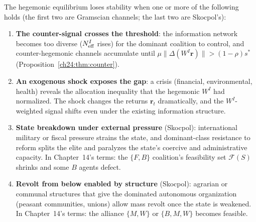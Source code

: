 \documentclass[../structural_economics_book.tex]{subfiles}
\begin{document}
\begin{conjecture}\label{ch24:prop:collapse}
The hegemonic equilibrium loses stability when one or more of the following holds (the first two are Gramscian channels; the last two are Skocpol's):
\begin{enumerate}
\item \textbf{The counter-signal crosses the threshold}: the information network becomes too diverse ($N_{\text{eff}}^I$ rises) for the dominant coalition to control, and counter-hegemonic channels accumulate until $\mu\|\Delta(W^I\mathbf{r})\| > (1-\rho)s^*$ (Proposition~\ref{ch24:thm:counter}).

\item \textbf{An exogenous shock exposes the gap}: a crisis (financial, environmental, health) reveals the allocation inequality that the hegemonic $W^I$ had normalized. The shock changes the returns $\mathbf{r}_t$ dramatically, and the $W^I$-weighted signal shifts even under the existing information structure.

\item \textbf{State breakdown under external pressure} (Skocpol): international military or fiscal pressure strains the state, and dominant-class resistance to reform splits the elite and paralyzes the state's coercive and administrative capacity. In Chapter~14's terms: the $\{F, B\}$ coalition's feasibility set $\mathcal{F}(S)$ shrinks and some $B$ agents defect.

\item \textbf{Revolt from below enabled by structure} (Skocpol): agrarian or communal structures that give the dominated autonomous organization (peasant communities, unions) allow mass revolt once the state is weakened. In Chapter~14's terms: the alliance $\{M, W\}$ or $\{B, M, W\}$ becomes feasible.
\end{enumerate}
\end{conjecture}
\end{document}
